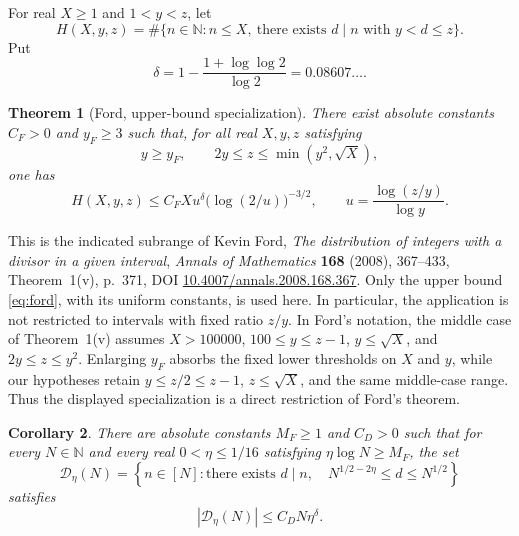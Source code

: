\documentclass[11pt]{article}
\newtheorem{theorem}{Theorem}[section]
\newtheorem{corollary}[theorem]{Corollary}
\theoremstyle{definition}
\theoremstyle{remark}
\numberwithin{equation}{section}
\newcommand{\N}{\mathbb N}
\begin{document}
For real \(X\ge1\) and \(1<y<z\), let
\[
 H(X,y,z)=
 \#\{n\in\N:n\le X,\ \text{there exists }d\mid n
                         \text{ with }y<d\le z\}.
\]
Put
\begin{equation}\label{eq:delta}
 \delta=
 1-\frac{1+\log\log2}{\log2}
 =0.08607\ldots.
\end{equation}

\begin{theorem}[Ford, upper-bound specialization]\label{thm:ford}
There exist absolute constants \(C_F>0\) and \(y_F\ge3\)
such that, for all real \(X,y,z\) satisfying
\[
 y\ge y_F,\qquad 2y\le z\le\min(y^2,\sqrt X),
\]
one has
\begin{equation}\label{eq:ford}
 H(X,y,z)
 \le C_F X
       u^\delta\bigl(\log(2/u)\bigr)^{-3/2},
 \qquad
 u=\frac{\log(z/y)}{\log y}.
\end{equation}
\end{theorem}

This is the indicated subrange of Kevin Ford,
\emph{The distribution of integers with a divisor in a given
interval}, \emph{Annals of Mathematics} \textbf{168} (2008),
367--433, Theorem~1(v), p.~371, DOI
\href{https://doi.org/10.4007/annals.2008.168.367}
{10.4007/annals.2008.168.367}.
Only the upper bound \eqref{eq:ford}, with its uniform constants, is
used here. In particular, the application is not
restricted to intervals with fixed ratio \(z/y\).
In Ford's notation, the middle case of Theorem~1(v) assumes
\(X>100000\), \(100\le y\le z-1\), \(y\le\sqrt X\), and
\(2y\le z\le y^2\). Enlarging \(y_F\) absorbs the fixed lower
thresholds on \(X\) and \(y\), while our hypotheses retain
\(y\le z/2\le z-1\), \(z\le\sqrt X\), and the same middle-case
range. Thus the displayed specialization is a direct restriction of
Ford's theorem.

\begin{corollary}\label{cor:ford-window}
There are absolute constants \(M_F\ge1\) and \(C_D>0\)
such that for every \(N\in\N\) and every real
\(0<\eta\le1/16\) satisfying \(\eta\log N\ge M_F\), the set
\[
 \mathcal D_\eta(N)=
 \left\{n\in[N]:
   \text{there exists }d\mid n,\quad
   N^{1/2-2\eta}\le d\le N^{1/2}
 \right\}
\]
satisfies
\begin{equation}\label{eq:ford-window}
 |\mathcal D_\eta(N)|\le C_DN\eta^\delta.
\end{equation}
\end{corollary}
\end{document}
